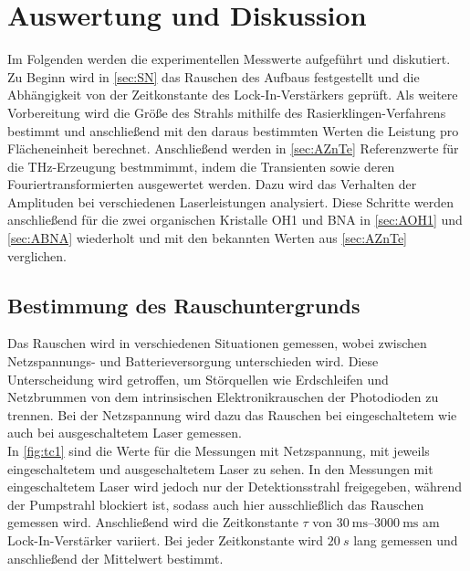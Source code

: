\chapter{Auswertung und Diskussion}
\label{sec:aus}

Im Folgenden werden die experimentellen Messwerte aufgeführt und diskutiert. 
Zu Beginn wird in \autoref{sec:SN} das Rauschen des Aufbaus festgestellt und die Abhängigkeit 
von der Zeitkonstante des Lock-In-Verstärkers geprüft. 
Als weitere Vorbereitung wird die Größe des Strahls mithilfe des 
Rasierklingen-Verfahrens bestimmt und anschließend mit den 
daraus bestimmten Werten die Leistung pro Flächeneinheit berechnet.
Anschließend werden in \autoref{sec:AZnTe} Referenzwerte für die THz-Erzeugung bestmmimmt, 
indem die Transienten sowie deren Fouriertransformierten 
ausgewertet werden. 
Dazu wird das Verhalten der Amplituden 
bei verschiedenen Laserleistungen analysiert. 
Diese Schritte werden anschließend für die zwei organischen Kristalle OH1 und BNA in \autoref{sec:AOH1} und \autoref{sec:ABNA} wiederholt 
und mit den bekannten Werten aus \autoref{sec:AZnTe} verglichen.


\section{Bestimmung des Rauschuntergrunds}
\label{sec:SN}
Das Rauschen wird in verschiedenen Situationen gemessen, 
wobei zwischen Netzspannungs- und 
Batterieversorgung unterschieden wird.
Diese Unterscheidung wird getroffen, um Störquellen wie Erdschleifen und Netzbrummen 
von dem intrinsischen Elektronikrauschen der Photodioden zu trennen. 
Bei der Netzspannung wird dazu das Rauschen bei 
eingeschaltetem wie auch bei ausgeschaltetem Laser gemessen. \\





In \autoref{fig:tc1} sind die Werte für die Messungen mit Netzspannung, mit jeweils eingeschaltetem und ausgeschaltetem Laser zu sehen. 
In den Messungen mit eingeschaltetem Laser wird jedoch nur der 
Detektionsstrahl 
freigegeben, während der Pumpstrahl blockiert ist, 
sodass auch hier ausschließlich das Rauschen gemessen wird.
Anschließend wird die Zeitkonstante $\tau$ von 
$\SIrange{30}{3000}{\milli\second}$ am Lock-In-Verstärker variiert. 
Bei jeder Zeitkonstante wird $\SI{20}{s}$ lang gemessen und 
anschließend der Mittelwert bestimmt. 

